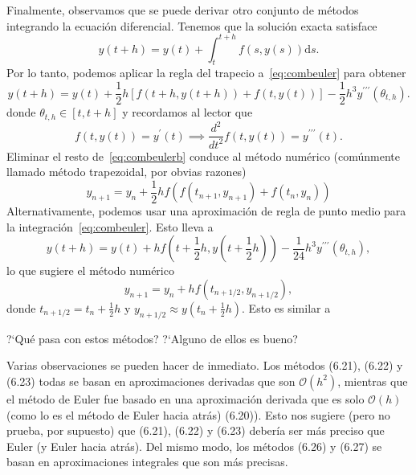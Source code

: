 Finalmente, observamos que se puede derivar otro conjunto de métodos integrando la ecuación diferencial. Tenemos que la solución exacta satisface
\begin{equation}\label{eq:combeuler}
y\left(t+h\right)=y\left(t\right)+\int_{t}^{t+h}f\left(s,y\left(s\right)\right)\mathrm{d}s.
\end{equation}
Por lo tanto, podemos aplicar la regla del trapecio a~\eqref{eq:combeuler} para  obtener
\begin{equation}\label{eq:combeulerb}
y\left(t+h\right)=y\left(t\right)+\frac{1}{2}h\left[f\left(t+h,y\left(t+h\right)\right)+f\left(t,y\left(t\right)\right)\right]-\frac{1}{2}h^{3}y^{\prime\prime\prime}\left(\theta_{t,h}\right).
\end{equation}
donde $\theta_{t,h}\in\left[t,t+h\right]$ y recordamos al lector que
\[ f\left(t,y\left(t\right)\right)=y^{\prime}\left(t\right)\implies\frac{d^{2}}{dt^{2}}f\left(t,y\left(t\right)\right)=y^{\prime\prime\prime}\left(t\right). \]
Eliminar el resto de~\eqref{eq:combeulerb} conduce al método numérico (comúnmente llamado método trapezoidal, por obvias razones)
\begin{equation}
y_{n+1}=y_{n}+\frac{1}{2}hf\left(f\left(t_{n+1},y_{n+1}\right)+f\left(t_{n},y_{n}\right)\right)
\end{equation}
Alternativamente, podemos usar una aproximación de regla de punto medio para la integración~\eqref{eq:combeuler}. Esto lleva a
\[ y\left(t+h\right)=y\left(t\right)+hf\left(t+\frac{1}{2}h,y\left(t+\frac{1}{2}h\right)\right)-\frac{1}{24}h^{3}y^{\prime\prime\prime}\left(\theta_{t,h}\right), \]
lo que sugiere el método numérico
\begin{equation}
y_{n+1}=y_{n}+hf\left(t_{n+1/2},y_{n+1/2}\right),
\end{equation}
donde $t_{n+1/2}=t_{n}+\frac{1}{2}h$ y $y_{n+1/2}\approx y\left(t_{n}+\frac{1}{2}h\right)$. Esto es similar a %

?`Qué pasa con estos métodos? ?`Alguno de ellos es bueno?

Varias observaciones se pueden hacer de inmediato. Los métodos (6.21), (6.22) y (6.23)
todas se basan en aproximaciones derivadas que son $\mathcal{O}\left(h^{2}\right)$, mientras que el método de Euler fue basado en una aproximación derivada que es solo $\mathcal{O}\left(h\right)$ (como lo es el método de Euler hacia atrás) (6.20)). Esto nos sugiere (pero no prueba, por supuesto) que (6.21), (6.22) y (6.23)
debería ser más preciso que Euler (y Euler hacia atrás). Del mismo modo, los métodos (6.26) y (6.27) se basan en aproximaciones integrales que son más precisas.


